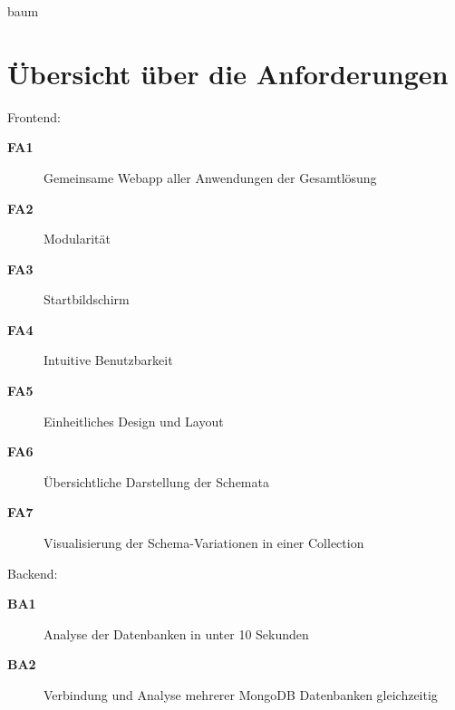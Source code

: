 \cleardoublepage
baum

\section{Übersicht über die Anforderungen}
\label{sec:anf_uebersicht}

Frontend:

\begin{description}
    \item[\textbf{FA1}\label{itm:fa1}] Gemeinsame Webapp aller Anwendungen der Gesamtlösung
    \item[\textbf{FA2}\label{itm:fa2}] Modularität
    \item[\textbf{FA3}\label{itm:fa3}] Startbildschirm
    \item[\textbf{FA4}\label{itm:fa4}] Intuitive Benutzbarkeit
    \item[\textbf{FA5}\label{itm:fa5}] Einheitliches Design und Layout
    \item[\textbf{FA6}\label{itm:fa6}] Übersichtliche Darstellung der Schemata
    \item[\textbf{FA7}\label{itm:fa7}] Visualisierung der Schema-Variationen in einer Collection
\end{description}

Backend:

\begin{description}
    \item[\textbf{BA1}\label{itm:ba1}] Analyse der Datenbanken in unter 10 Sekunden
    \item[\textbf{BA2}\label{itm:ba2}] Verbindung und Analyse mehrerer MongoDB Datenbanken gleichzeitig
\end{description}

